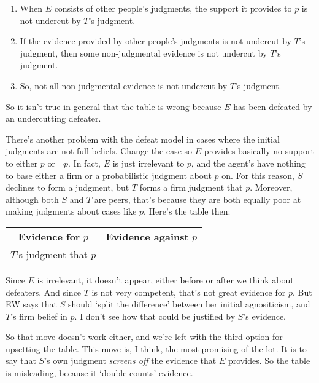 \documentclass[
  11pt,
  letterpaper,
  DIV=11,
  numbers=noendperiod,
  oneside]{scrartcl}
\providecommand{\tightlist}{%
  \setlength{\itemsep}{0pt}\setlength{\parskip}{0pt}}\usepackage{longtable,booktabs,array}
\begin{document}
\begin{enumerate}
\def\labelenumi{\arabic{enumi}.}
\tightlist
\item
  When \(E\) consists of other people's judgments, the support it
  provides to \(p\) is not undercut by \(T\)'s judgment.
\item
  If the evidence provided by other people's judgments is not undercut
  by \(T\)'s judgment, then some non-judgmental evidence is not undercut
  by \(T\)'s judgment.
\item
  So, not all non-judgmental evidence is not undercut by \(T\)'s
  judgment.
\end{enumerate}

So it isn't true in general that the table is wrong because \(E\) has
been defeated by an undercutting defeater.

There's another problem with the defeat model in cases where the initial
judgments are not full beliefs. Change the case so \(E\) provides
basically no support to either \(p\) or \(\neg p\). In fact, \(E\) is
just irrelevant to \(p\), and the agent's have nothing to base either a
firm or a probabilistic judgment about \(p\) on. For this reason, \(S\)
declines to form a judgment, but \(T\) forms a firm judgment that \(p\).
Moreover, although both \(S\) and \(T\) are peers, that's because they
are both equally poor at making judgments about cases like \(p\). Here's
the table then:

\begin{longtable}[]{@{}cc@{}}
\toprule\noalign{}
\endhead
\bottomrule\noalign{}
\endlastfoot
\textbf{Evidence for} \(p\) & \textbf{Evidence against} \(p\) \\
\(T\)'s judgment that \(p\) & \\
\end{longtable}

Since \(E\) is irrelevant, it doesn't appear, either before or after we
think about defeaters. And since \(T\) is not very competent, that's not
great evidence for \(p\). But EW says that \(S\) should `split the
difference' between her initial agnositicism, and \(T\)'s firm belief in
\(p\). I don't see how that could be justified by \(S\)'s evidence.

So that move doesn't work either, and we're left with the third option
for upsetting the table. This move is, I think, the most promising of
the lot. It is to say that \(S\)'s own judgment \emph{screens off} the
evidence that \(E\) provides. So the table is misleading, because it
`double counts' evidence.
\end{document}
